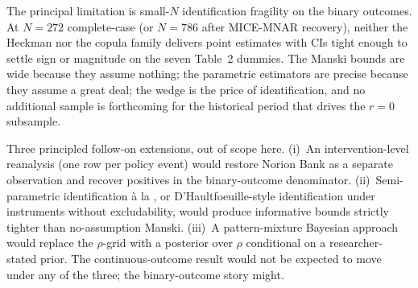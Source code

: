 \documentclass[11pt]{article}
\begin{document}
The principal limitation is small-$N$ identification fragility on the
binary outcomes. At $N = 272$ complete-case (or $N = 786$ after
MICE-MNAR recovery), neither the Heckman nor the copula family
delivers point estimates with CIs tight enough to settle sign or
magnitude on the seven Table~2 dummies. The Manski bounds are wide
because they assume nothing; the parametric estimators are precise
because they assume a great deal; the wedge is the price of
identification, and no additional sample is forthcoming for the
historical period that drives the $r = 0$ subsample.

Three principled follow-on extensions, out of scope here. (i)~An
intervention-level reanalysis (one row per policy event) would
restore Norion Bank as a separate observation and recover positives
in the binary-outcome denominator. (ii)~Semi-parametric identification
\`a la \citet{horowitz1998}, or D'Haultfoeuille-style identification
under instruments without excludability, would produce informative
bounds strictly tighter than no-assumption Manski. (iii)~A pattern-mixture
Bayesian approach would replace the $\rho$-grid with a posterior over
$\rho$ conditional on a researcher-stated prior. The continuous-outcome
result would not be expected to move under any of the three; the
binary-outcome story might.

{\footnotesize
\renewcommand{\baselinestretch}{0.92}\selectfont


}
\end{document}
